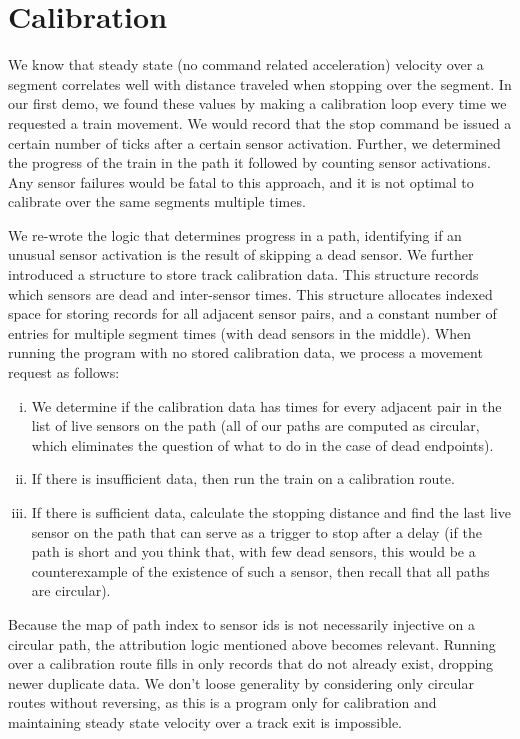 \documentclass{amsart}
\begin{document}
\section*{Calibration}

We know that steady state (no command related acceleration) velocity over a segment correlates well with distance traveled when stopping over the segment. In our first demo, we found these values by making a calibration loop every time we requested a train movement. We would record that the stop command be issued a certain number of ticks after a certain sensor activation. Further, we determined the progress of the train in the path it followed by counting sensor activations. Any sensor failures would be fatal to this approach, and it is not optimal to calibrate over the same segments multiple times.

We re-wrote the logic that determines progress in a path, identifying if an unusual sensor activation is the result of skipping a dead sensor. We further introduced a structure to store track calibration data. This structure records which sensors are dead and inter-sensor times. This structure allocates indexed space for storing records for all adjacent sensor pairs, and a constant number of entries for multiple segment times (with dead sensors in the middle). When running the program with no stored calibration data, we process a movement request as follows:
\begin{enumerate}[i.]
    \item We determine if the calibration data has times for every adjacent pair in the list of live sensors on the path (all of our paths are computed as circular, which eliminates the question of what to do in the case of dead endpoints).
    \item If there is insufficient data, then run the train on a calibration route.
    \item If there is sufficient data, calculate the stopping distance and find the last live sensor on the path that can serve as a trigger to stop after a delay (if the path is short and you think that, with few dead sensors, this would be a counterexample of the existence of such a sensor, then recall that all paths are circular).
\end{enumerate}
Because the map of path index to sensor ids is not necessarily injective on a circular path, the attribution logic mentioned above becomes relevant. Running over a calibration route fills in only records that do not already exist, dropping newer duplicate data. We don't loose generality by considering only circular routes without reversing, as this is a program only for calibration and maintaining steady state velocity over a track exit is impossible.
\end{document}
